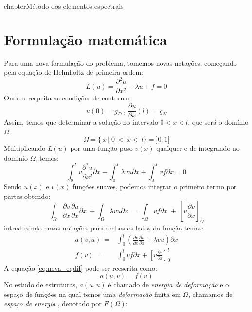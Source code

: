 chapter{Método dos elementos espectrais}
\label{cap:II}

\section{Formulação matemática}
 Para uma nova formulação do problema, tomemos novas notações, começando pela equação de Helmholtz de primeira ordem:
\begin{equation}
 L(u) = \frac{\partial^2 u}{\partial x^2} - \lambda u + f = 0
\end{equation}
 Onde u respeita as condições de contorno:\\
\begin{equation}
 u(0) = g_D \ , \ \frac{\partial u}{\partial x}(l) = g_N
\end{equation}
 Assim, temos que determinar a solução no intervalo $ 0 < x < l$, que será o domínio $\Omega$.
\begin{equation}
 \Omega = \{\ x\ |\ 0\ <\ x <\ l\} = ]0,1]
\end{equation}
 Multiplicando $L(u)$ por uma função peso $v(x)$ qualquer e de integrando no domínio $\Omega$, temos:
 \begin{equation}
 \int^{l}_0 v \frac{\partial^2 u}{\partial x^2} \partial x - \int^{l}_0 \lambda v u \partial x + \int^{l}_0 v f \partial x = 0
 \end{equation}
 Sendo $u(x)$ e $v(x)$ funções suaves, podemos integrar o primeiro termo por partes obtendo:
 \begin{equation}\label{eq:nova_eqdif}
 \int_\Omega \frac{\partial v}{\partial x} \frac{\partial u}{\partial x} \partial x\ + \int_\Omega \lambda v u \partial x\ =\ \int_\Omega vf \partial x\ +\ \left[ v \frac{\partial v}{\partial x} \right]_\Omega
 \end{equation}
 introduzindo novas notações para ambos os lados da função temos: 
\begin{align}
 a(v,u)\ = & \int^l_{0} \left(\frac{\partial v}{\partial x}\frac{\partial u}{\partial x} + \lambda v u\right) \partial x\\
 f(v)\ = & \int^{l}_0 v f \partial x + \left[v \frac{\partial v}{\partial x}\right]^{l}_{0} 
\end{align}
 A equação \ref{eq:nova_eqdif} pode ser reescrita como:
 \begin{equation}
 a(u,v) = f(v)
 \end{equation}
 No estudo de estruturas,  $a(u,u)$ é chamado de \emph{energia de deformação} e o espaço de funções na qual temos uma \emph{deformação} finita em $\Omega$, chamamos de \emph{espaço de energia} , denotado por $E(\Omega)$:
